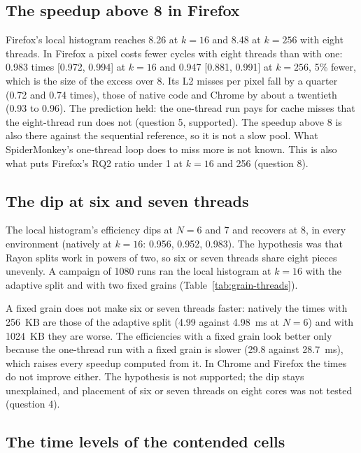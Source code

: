 \subsection{The speedup above 8 in Firefox}
\label{sec:why-superlinear}

Firefox's local histogram reaches 8.26 at $k=16$ and 8.48 at $k=256$ with
eight threads. In Firefox a pixel costs fewer cycles with eight threads
than with one: 0.983 times [0.972, 0.994] at $k=16$ and 0.947 [0.881,
0.991] at $k=256$, 5\% fewer, which is the size of the excess over 8. Its
L2 misses per pixel fall by a quarter (0.72 and 0.74 times), those of
native code and Chrome by about a twentieth (0.93 to 0.96). The prediction
held: the one-thread run pays for cache misses that the eight-thread run
does not (question 5, supported). The speedup above 8 is also there against
the sequential reference, so it is not a slow pool. What SpiderMonkey's
one-thread loop does to miss more is not known. This is also what puts
Firefox's RQ2 ratio under 1 at $k=16$ and 256 (question 8).

\subsection{The dip at six and seven threads}
\label{sec:dip}

The local histogram's efficiency dips at $N=6$ and 7 and recovers at 8, in
every environment (natively at $k=16$: 0.956, 0.952, 0.983). The hypothesis
was that Rayon splits work in powers of two, so six or seven threads share
eight pieces unevenly. A campaign of 1080 runs ran the local histogram at
$k=16$ with the adaptive split and with two fixed grains
(Table~\ref{tab:grain-threads}).



A fixed grain does not make six or seven threads faster: natively the
times with 256~KB are those of the adaptive split (4.99 against 4.98~ms at
$N=6$) and with 1024~KB they are worse. The efficiencies with a fixed grain
look better only because the one-thread run with a fixed grain is slower
(29.8 against 28.7~ms), which raises every speedup computed from it. In
Chrome and Firefox the times do not improve either. The hypothesis is not
supported; the dip stays unexplained, and placement of six or seven threads
on eight cores was not tested (question 4).

\subsection{The time levels of the contended cells}
\label{sec:levels}

